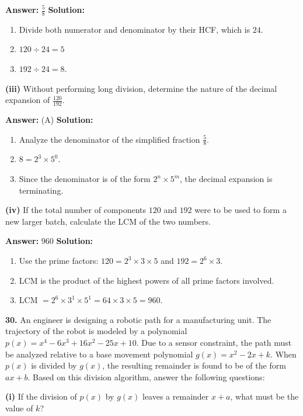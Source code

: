 \documentclass[12pt,a4paper]{exam}
\begin{document}
\begin{questions}
\textbf{Answer:} $\frac{5}{8}$
\textbf{Solution:}
\begin{enumerate}
  \item Divide both numerator and denominator by their HCF, which is $24$.
  \item $120 \div 24 = 5$
  \item $192 \div 24 = 8$.
\end{enumerate}

\textbf{(iii)} Without performing long division, determine the nature of the decimal expansion of $\frac{120}{192}$.

\textbf{Answer:} (A)
\textbf{Solution:}
\begin{enumerate}
  \item Analyze the denominator of the simplified fraction $\frac{5}{8}$.
  \item $8 = 2^3 \times 5^0$.
  \item Since the denominator is of the form $2^n \times 5^m$, the decimal expansion is terminating.
\end{enumerate}

\textbf{(iv)} If the total number of components $120$ and $192$ were to be used to form a new larger batch, calculate the LCM of the two numbers.

\textbf{Answer:} $960$
\textbf{Solution:}
\begin{enumerate}
  \item Use the prime factors: $120 = 2^3 \times 3 \times 5$ and $192 = 2^6 \times 3$.
  \item LCM is the product of the highest powers of all prime factors involved.
  \item LCM $= 2^6 \times 3^1 \times 5^1 = 64 \times 3 \times 5 = 960$.
\end{enumerate}

\vspace{0.3cm}

\question \textbf{30.} An engineer is designing a robotic path for a manufacturing unit. The trajectory of the robot is modeled by a polynomial $p(x) = x^4 - 6x^3 + 16x^2 - 25x + 10$. Due to a sensor constraint, the path must be analyzed relative to a base movement polynomial $g(x) = x^2 - 2x + k$. When $p(x)$ is divided by $g(x)$, the resulting remainder is found to be of the form $ax + b$. Based on this division algorithm, answer the following questions:

\textbf{(i)} If the division of $p(x)$ by $g(x)$ leaves a remainder $x + a$, what must be the value of $k$?


\end{questions}
\end{document}
